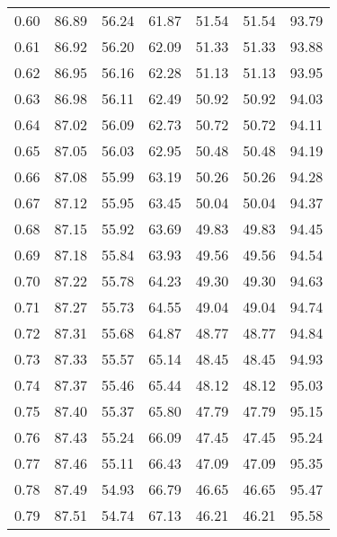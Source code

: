 \begin{tabular}{|c|c|c|c|c|c|c|}
      0.60 &     86.89 &     56.24 &      61.87 &   51.54 &      51.54 &         93.79 \\
      0.61 &     86.92 &     56.20 &      62.09 &   51.33 &      51.33 &         93.88 \\
      0.62 &     86.95 &     56.16 &      62.28 &   51.13 &      51.13 &         93.95 \\
      0.63 &     86.98 &     56.11 &      62.49 &   50.92 &      50.92 &         94.03 \\
      0.64 &     87.02 &     56.09 &      62.73 &   50.72 &      50.72 &         94.11 \\
      0.65 &     87.05 &     56.03 &      62.95 &   50.48 &      50.48 &         94.19 \\
      0.66 &     87.08 &     55.99 &      63.19 &   50.26 &      50.26 &         94.28 \\
      0.67 &     87.12 &     55.95 &      63.45 &   50.04 &      50.04 &         94.37 \\
      0.68 &     87.15 &     55.92 &      63.69 &   49.83 &      49.83 &         94.45 \\
      0.69 &     87.18 &     55.84 &      63.93 &   49.56 &      49.56 &         94.54 \\
      0.70 &     87.22 &     55.78 &      64.23 &   49.30 &      49.30 &         94.63 \\
      0.71 &     87.27 &     55.73 &      64.55 &   49.04 &      49.04 &         94.74 \\
      0.72 &     87.31 &     55.68 &      64.87 &   48.77 &      48.77 &         94.84 \\
      0.73 &     87.33 &     55.57 &      65.14 &   48.45 &      48.45 &         94.93 \\
      0.74 &     87.37 &     55.46 &      65.44 &   48.12 &      48.12 &         95.03 \\
      0.75 &     87.40 &     55.37 &      65.80 &   47.79 &      47.79 &         95.15 \\
      0.76 &     87.43 &     55.24 &      66.09 &   47.45 &      47.45 &         95.24 \\
      0.77 &     87.46 &     55.11 &      66.43 &   47.09 &      47.09 &         95.35 \\
      0.78 &     87.49 &     54.93 &      66.79 &   46.65 &      46.65 &         95.47 \\
      0.79 &     87.51 &     54.74 &      67.13 &   46.21 &      46.21 &         95.58 \\

\end{tabular}
